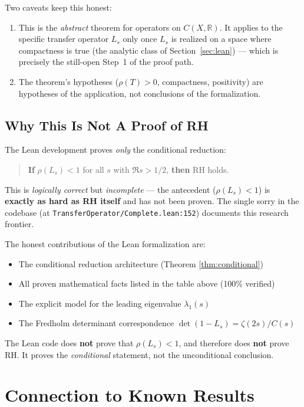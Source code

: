 \documentclass[11pt,a4paper]{article}
\theoremstyle{definition}
\begin{document}
{Two caveats keep this honest:
\begin{enumerate}
\item This is the \emph{abstract} theorem for operators on $C(X,\mathbb{R})$.
It applies to the specific transfer operator $L_s$ only once $L_s$ is realized
on a space where compactness is true (the analytic class of
Section~\ref{sec:lean}) --- which is precisely the still-open Step~1 of the
proof path.
\item The theorem's hypotheses ($\rho(T) > 0$, compactness, positivity) are
hypotheses of the application, not conclusions of the formalization.
\end{enumerate}

\subsection{Why This Is Not A Proof of RH}

The Lean development proves {\em only} the conditional reduction:

\begin{quote}
{\bf If} $\rho(L_s) < 1$ for all $s$ with $\Re s > 1/2$, {\bf then} RH holds.
\end{quote}

This is {\em logically correct} but {\em incomplete} — the antecedent ($\rho(L_s) < 1$) is {\bf exactly as hard as RH itself} and has not been proven. The single sorry in the codebase (at \texttt{TransferOperator/Complete.lean:152}) documents this research frontier.

The honest contributions of the Lean formalization are:
\begin{itemize}
\item The conditional reduction architecture (Theorem \ref{thm:conditional})
\item All proven mathematical facts listed in the table above (100\% verified)
\item The explicit model for the leading eigenvalue $\lambda_1(s)$
\item The Fredholm determinant correspondence $\det(1 - L_s) = \zeta(2s) / C(s)$
\end{itemize}

\noindent The Lean code does {\bf not} prove that $\rho(L_s) < 1$, and therefore does {\bf not} prove RH. It proves the {\em conditional} statement, not the unconditional conclusion.

\section{Connection to Known Results}
\label{sec:connections}

}
\end{document}
